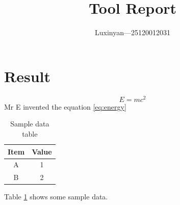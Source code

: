\documentclass{article}
\begin{document}
\title{Tool Report}
\author{Luxinyan—25120012031}
\maketitle
\section{Result}
\begin{equation}
    E = mc^2
    \label{eq:energy}
\end{equation}
Mr E invented the equation \ref{eq:energy}
\begin{table}[h]
    \centering
    \begin{tabular}{|c|c|}
        \hline
        Item & Value \\
        \hline
        A & 1 \\
        B & 2 \\
        \hline
    \end{tabular}
    \caption{Sample data table}
    \label{tab:sample}
\end{table}
Table \ref{tab:sample} shows some sample data.
\end{document}
